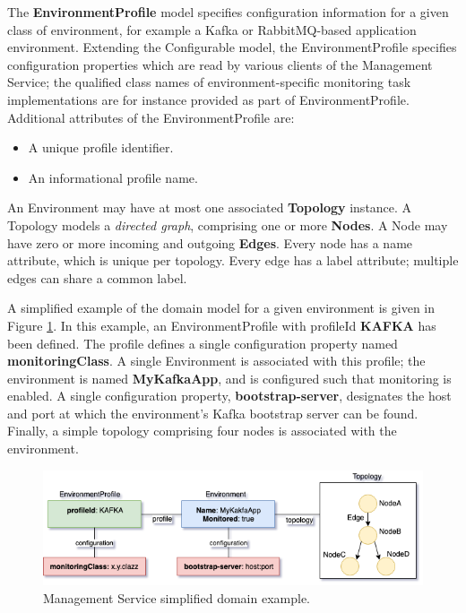 The \textbf{EnvironmentProfile} model specifies configuration information for a given class of environment, for example a Kafka or RabbitMQ-based application environment. Extending the Configurable model, the EnvironmentProfile specifies configuration properties which are read by various clients of the Management Service; the qualified class names of environment-specific monitoring task implementations are for instance provided as part of EnvironmentProfile. Additional attributes of the EnvironmentProfile are:
\begin{itemize}
	\item A unique profile identifier.
	\item An informational profile name.
\end{itemize}

An Environment may have at most one associated \textbf{Topology} instance. A Topology models a \textit{directed graph}, comprising one or more \textbf{Nodes}. A Node may have zero or more incoming and outgoing \textbf{Edges}. Every node has a name attribute, which is unique per topology. Every edge has a label attribute; multiple edges can share a common label.

A simplified example of the domain model for a given environment is given in Figure \ref{mgmt_svc_domain_model_example}. In this example, an EnvironmentProfile with profileId \textbf{KAFKA} has been defined. The profile defines a single configuration property named  \textbf{monitoringClass}. A single Environment is associated with this profile; the environment is named  \textbf{MyKafkaApp}, and is configured such that monitoring is enabled. A single configuration property, \textbf{bootstrap-server}, designates the host and port at which the environment's Kafka bootstrap server can be found. Finally, a simple topology comprising four nodes is associated with the environment.

 \begin{figure}[H]
	\centering  
	\includegraphics[width=\linewidth]{figures/impl/mgmt/mgmt_domain_example.png}
	\caption{Management Service simplified domain example.}
	\label{mgmt_svc_domain_model_example}
\end{figure}

